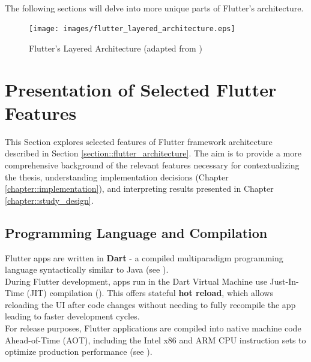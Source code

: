 \paragraph{}
The following sections will delve into more unique parts of Flutter's architecture.

\begin{figure}
    \centering
    \texttt{[image: images/flutter\_layered\_architecture.eps]}
    \caption{Flutter's Layered Architecture (adapted from \cite{FlutterArchitecture2021})}
    \label{fig:flutter_layered_architecture}
\end{figure}

\section{Presentation of Selected Flutter Features}
This Section explores selected features of Flutter framework architecture described in Section \ref{section::flutter_architecture}.
The aim is to provide a more comprehensive background of the relevant features necessary for contextualizing the thesis, understanding implementation decisions (Chapter \ref{chapter::implementation}), and interpreting results presented in Chapter \ref{chapter::study_design}.

\subsection{Programming Language and Compilation} \label{section::programming_language}
Flutter apps are written in \textbf{Dart} - a compiled multiparadigm programming language syntactically similar to Java (see \cite{DartLanguage2021}).\\
During Flutter development, apps run in the Dart Virtual Machine use Just-In-Time (JIT) compilation (\cite{DartLanguage2021}). 
This offers stateful \textbf{hot reload}, which allows reloading the UI after code changes without needing to fully recompile the app leading to faster development cycles.\\
For release purposes, Flutter applications are compiled into native machine code Ahead-of-Time (AOT), including the Intel x86 and ARM CPU instruction sets to optimize production performance (see \cite{FlutterArchitecture2021}).


